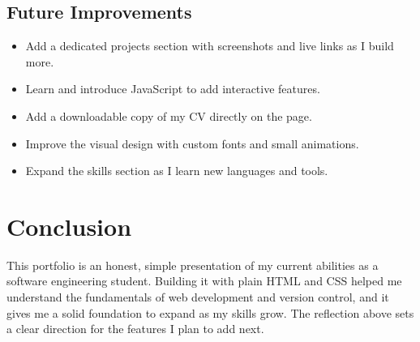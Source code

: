 \documentclass[11pt,a4paper]{article}
\begin{document}
\subsection{Future Improvements}
\begin{itemize}
  \item Add a dedicated projects section with screenshots and live links as I
    build more.
  \item Learn and introduce JavaScript to add interactive features.
  \item Add a downloadable copy of my CV directly on the page.
  \item Improve the visual design with custom fonts and small animations.
  \item Expand the skills section as I learn new languages and tools.
\end{itemize}

\section{Conclusion}
This portfolio is an honest, simple presentation of my current abilities as a
software engineering student. Building it with plain HTML and CSS helped me
understand the fundamentals of web development and version control, and it gives
me a solid foundation to expand as my skills grow. The reflection above sets a
clear direction for the features I plan to add next.
\end{document}

